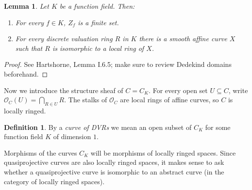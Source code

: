 \documentclass[reqno,12pt,letterpaper]{amsart}
\newcommand{\dfn}[1]{\emph{#1}\index{#1}}
\newcommand{\Olo}{\mathscr O}
\newtheorem{lemma}[theorem]{Lemma}
\theoremstyle{definition}
\newtheorem{definition}[theorem]{Definition}
\begin{document}
\begin{lemma}
Let $K$ be a function field.
Then:
\begin{enumerate}
\item For every $f \in K$, $Z_f$ is a finite set.
\item For every discrete valuation ring $R$ in $K$ there is a smooth affine curve $X$ such that $R$ is isomorphic to a local ring of $X$.
\end{enumerate}
\end{lemma}
\begin{proof}
See Hartshorne, Lemma I.6.5; make sure to review Dedekind domains beforehand.
\end{proof}

Now we introduce the structure sheaf of $C = C_K$.
For every open set $U \subseteq C$, write $\Olo_C(U) = \bigcap_{R \in U} R$.
The stalks of $\Olo_C$ are local rings of affine curves, so $C$ is locally ringed.

\begin{definition}
By a \dfn{curve of DVRs} we mean an open subset of $C_K$ for some function field $K$ of dimension $1$.
\end{definition}

Morphisms of the curves $C_K$ will be morphisms of locally ringed spaces.
Since quasiprojective curves are also locally ringed spaces, it makes sense to ask whether a quasiprojective curve is isomorphic to an abstract curve (in the category of locally ringed spaces).
\end{document}

